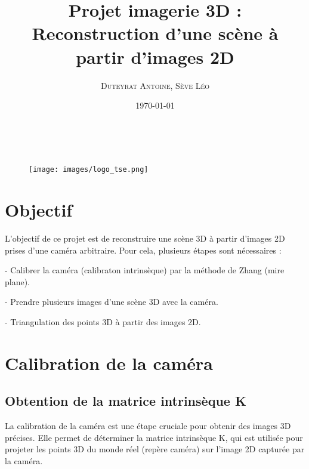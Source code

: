 \documentclass[12pt]{article}
\title{\textbf{Projet imagerie 3D : Reconstruction d'une scène à partir d'images 2D}}
\author{
    \textsc{Duteyrat Antoine},
    \textsc{Sève Léo}
}
\date{\today}
\makeatletter
\let\titre\@title
\let\auteurs\@author
\let\date\@date
\makeatother
\begin{document}
\begin{titlepage}
    \begin{center}
        \vskip 1.5cm
        {\color {couleur}{\huge \bf \titre}}\\[5mm]
        \vskip 0.5cm
        \begin{figure}[h]
        \centering
        \texttt{[image: images/logo\_tse.png]}
        \end{figure}
        \vskip 1cm
        {\large {\auteurs}}
        \vskip 0.5cm
        \vfill
        \vskip 0.2cm
        \date
      \end{center}
\end{titlepage}
\clearpage

\tableofcontents

\newpage

\section{Objectif}

L'objectif de ce projet est de reconstruire une scène 3D à partir d'images 2D prises d'une caméra arbitraire.
Pour cela, plusieurs étapes sont nécessaires :

- Calibrer la caméra (calibraton intrinsèque) par la méthode de Zhang (mire plane).

- Prendre plusieurs images d'une scène 3D avec la caméra.

- Triangulation des points 3D à partir des images 2D.

\newpage

\section{Calibration de la caméra}

\subsection{Obtention de la matrice intrinsèque K}

La calibration de la caméra est une étape cruciale pour obtenir des images 3D précises.
Elle permet de déterminer la matrice intrinsèque K, qui est utilisée pour projeter les points 3D du monde réel (repère caméra) sur l'image 2D capturée par la caméra.
\end{document}
